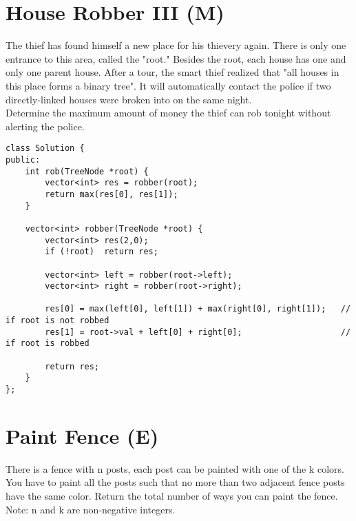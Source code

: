 \section{House Robber III (M)}
The thief has found himself a new place for his thievery again. There is only one entrance to this area, called the "root." Besides the root, each house has one and only one parent house. After a tour, the smart thief realized that "all houses in this place forms a binary tree". It will automatically contact the police if two directly-linked houses were broken into on the same night. \\

Determine the maximum amount of money the thief can rob tonight without alerting the police. \\

\begin{lstlisting}
class Solution {
public:
    int rob(TreeNode *root) {
        vector<int> res = robber(root);
        return max(res[0], res[1]);
    }
    
    vector<int> robber(TreeNode *root) {
        vector<int> res(2,0);
        if (!root)  return res;
        
        vector<int> left = robber(root->left);
        vector<int> right = robber(root->right);
        
        res[0] = max(left[0], left[1]) + max(right[0], right[1]);   // if root is not robbed
        res[1] = root->val + left[0] + right[0];                    // if root is robbed
        
        return res;
    }
};
\end{lstlisting}


\section{Paint Fence (E)}
There is a fence with n posts, each post can be painted with one of the k colors. You have to paint all the posts such that no more than two adjacent fence posts have the same color. Return the total number of ways you can paint the fence.\\

Note: n and k are non-negative integers.\\

